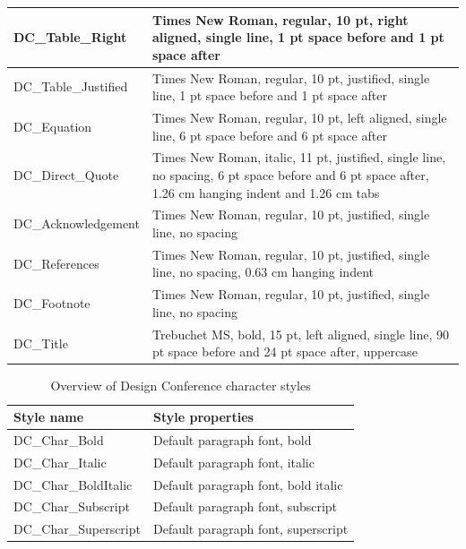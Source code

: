 \documentclass{design}
\begin{document}
\begin{table}[h!]
\begin{tabular}{ |l|L{0.7\textwidth}| }
        DC\_Table\_Right & Times New Roman, regular, 10 pt, right aligned, single line, 1 pt space before and 1 pt space after \\ \hline
        DC\_Table\_Justified & Times New Roman, regular, 10 pt, justified, single line, 1 pt space before and 1 pt space after \\ \hline
        DC\_Equation & Times New Roman, regular, 10 pt, left aligned, single line, 6 pt space before and 6 pt space after \\ \hline
        DC\_Direct\_Quote & Times New Roman, italic, 11 pt, justified, single line, no spacing, 6 pt space before and 6 pt space after, 1.26 cm hanging indent and 1.26 cm tabs \\ \hline
        DC\_Acknowledgement & Times New Roman, regular, 10 pt, justified, single line, no spacing \\ \hline
        DC\_References & Times New Roman, regular, 10 pt, justified, single line, no spacing, 0.63 cm hanging indent \\ \hline
        DC\_Footnote & Times New Roman, regular, 10 pt, justified, single line, no spacing \\ \hline
        DC\_Title & Trebuchet MS, bold, 15 pt, left aligned, single line, 90 pt space before and 24 pt space after, uppercase \\ \hline
    \end{tabular}
\end{table}

\begin{table}[h!]
    \centering
    \small
    \caption{Overview of Design Conference character styles}
    \label{tab:three}
    \begin{tabular}{ |l|L{0.7\textwidth}| }
        \hline
        \textbf{Style name} & \textbf{Style properties} \\
        \hline
        DC\_Char\_Bold & Default paragraph font, bold \\ \hline
        DC\_Char\_Italic & Default paragraph font, italic \\ \hline
        DC\_Char\_BoldItalic & Default paragraph font, bold italic \\ \hline
        DC\_Char\_Subscript & Default paragraph font, subscript \\ \hline
        DC\_Char\_Superscript & Default paragraph font, superscript \\ \hline
    \end{tabular}
\end{table}
\end{document}
